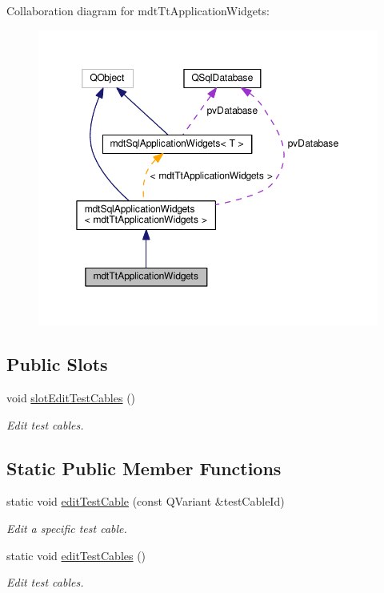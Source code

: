 Collaboration diagram for mdt\-Tt\-Application\-Widgets\-:
\nopagebreak
\begin{figure}[H]
\begin{center}
\leavevmode
\includegraphics[width=350pt]{classmdt_tt_application_widgets__coll__graph}
\end{center}
\end{figure}
\subsection*{Public Slots}
\begin{DoxyCompactItemize}
\item 
void \hyperlink{classmdt_tt_application_widgets_ade43e8c686f77f2c8ffb5027a5afbe2d}{slot\-Edit\-Test\-Cables} ()
\begin{DoxyCompactList}\small\item\em Edit test cables. \end{DoxyCompactList}\end{DoxyCompactItemize}
\subsection*{Static Public Member Functions}
\begin{DoxyCompactItemize}
\item 
static void \hyperlink{classmdt_tt_application_widgets_ada31681ad53cfb7f93bfd9aa53ef30e6}{edit\-Test\-Cable} (const Q\-Variant \&test\-Cable\-Id)
\begin{DoxyCompactList}\small\item\em Edit a specific test cable. \end{DoxyCompactList}\item 
static void \hyperlink{classmdt_tt_application_widgets_ab8951db00142173b5124dcfd81804b56}{edit\-Test\-Cables} ()
\begin{DoxyCompactList}\small\item\em Edit test cables. \end{DoxyCompactList}\end{DoxyCompactItemize}
